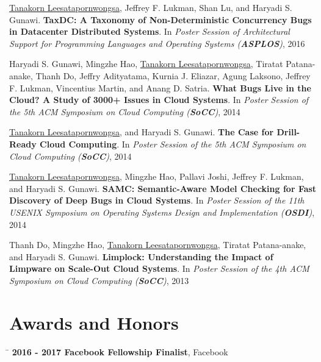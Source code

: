 \documentclass[10pt]{article} %
\begin{document}
\underline{Tanakorn Leesatapornwongsa,} Jeffrey F. Lukman, Shan Lu, and Haryadi
S. Gunawi. \textbf{TaxDC: A Taxonomy of Non-Deterministic Concurrency Bugs in
Datacenter Distributed Systems}. In \textit{Poster Session of Architectural
Support for Programming Languages and Operating Systems (\textbf{ASPLOS})}, 2016
\vspace{2mm}

Haryadi S. Gunawi, Mingzhe Hao, \underline{Tanakorn Leesatapornwongsa}, Tiratat
Patana-anake, Thanh Do, Jeffry Adityatama, Kurnia J. Eliazar, Agung Laksono,
Jeffrey F. Lukman, Vincentius Martin, and Anang D. Satria. \textbf{What Bugs
Live in the Cloud? A Study of 3000+ Issues in Cloud Systems}. In
\textit{Poster Session of the 5th ACM Symposium on Cloud Computing (\textbf{SoCC})}, 2014
\vspace{2mm}

\underline{Tanakorn Leesatapornwongsa,} and Haryadi S. Gunawi. \textbf{The Case
for Drill-Ready Cloud Computing}. In \textit{Poster Session of the 5th ACM
Symposium on Cloud Computing (\textbf{SoCC})}, 2014
\vspace{2mm}

\underline{Tanakorn Leesatapornwongsa,} Mingzhe Hao, Pallavi Joshi, Jeffrey F.
Lukman, and Haryadi S. Gunawi. \textbf{SAMC: Semantic-Aware Model Checking for
Fast Discovery of Deep Bugs in Cloud Systems}. In \textit{Poster Session of the
11th USENIX Symposium on Operating Systems Design and Implementation (\textbf{OSDI})},
2014
\vspace{2mm}

Thanh Do, Mingzhe Hao, \underline{Tanakorn Leesatapornwongsa}, Tiratat
Patana-anake, and Haryadi S. Gunawi. \textbf{Limplock: Understanding the Impact
of Limpware on Scale-Out Cloud Systems}. In \textit{Poster Session of the 4th ACM
Symposium on Cloud Computing (\textbf{SoCC})}, 2013


\section{Awards and Honors}

\begin{tabbing}
\hspace{2.5cm} \=  \> \textbf{2016 - 2017 Facebook Fellowship Finalist}, Facebook
\end{tabbing}
\end{document}
